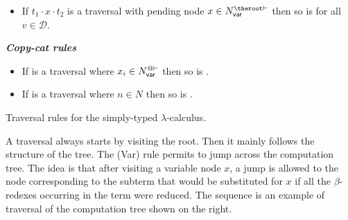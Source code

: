 \begin{FramedTable}
\begin{itemize}[]
\item {} If $t_1
\cdot x \cdot t_2$ is a traversal with pending node $x \in
N_{\sf var}^{\theroot\vdash}$ then so is  for all $v \in
\mathcal{D}$.
\end{itemize}

\emph{\bf Copy-cat rules}
\begin{itemize}[]
\item{}
If  is a traversal where $x_i \in
    N_{\sf var}^{@\vdash}$ then so is .

\item{}
  If  is a traversal where $n\in N$ then so is
.
\end{itemize}
\caption[Traversal rules for the simply-typed
lambda-calculus]{Traversal rules for the simply-typed
$\lambda$-calculus.} \label{tab:trav_rules}
\end{FramedTable}

 A traversal always starts by visiting the root. Then it mainly
follows the structure of the tree. The (Var) rule permits to jump
across the computation tree. The idea is that after visiting a
variable node $x$, a jump is allowed to the node corresponding to
the subterm that would be substituted for $x$ if all the
$\beta$-redexes occurring in the term were reduced. The sequence
 is an example of traversal of the computation tree shown on the right.

